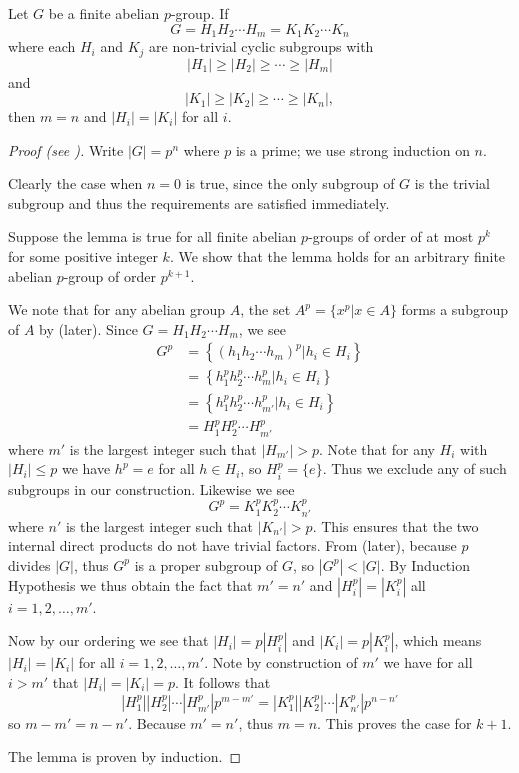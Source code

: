 \begin{lemma}\label{lemma-fundamental-theorem-of-finite-abelian-groups-4}
    Let $G$ be a finite abelian $p$-group. If
    \[
        G = H_1H_2\cdots H_m = K_1K_2\cdots K_n
    \]
    where each $H_i$ and $K_j$ are non-trivial cyclic subgroups with
    \[
        |H_1| \geq |H_2| \geq \cdots \geq |H_m|
    \]
    and
    \[
        |K_1| \geq |K_2| \geq \cdots \geq |K_n|,
    \]
    then $m = n$ and $|H_i| = |K_i|$ for all $i$.
\end{lemma}
\begin{proof}[Proof (see {\cite[p.~219, Lemma 4]{gallian_2016}})]
    Write $|G| = p^n$ where $p$ is a prime; we use strong induction on $n$.

    Clearly the case when $n = 0$ is true, since the only subgroup of $G$ is the trivial subgroup and thus the requirements are satisfied immediately.

    Suppose the lemma is true for all finite abelian $p$-groups of order of at most $p^k$ for some positive integer $k$. We show that the lemma holds for an arbitrary finite abelian $p$-group of order $p^{k+1}$.

    We note that for any abelian group $A$, the set $A^p = \{x^p \vert x \in A\}$ forms a subgroup of $A$ by  (later). Since $G = H_1H_2\cdots H_m$, we see
    \begin{align*}
        G^p &= \left\{\left(h_1h_2\cdots h_m\right)^p \vert h_i \in H_i\right\}\\
        &= \left\{h_1^ph_2^p\cdots h_m^p \vert h_i \in H_i\right\}\\
        &= \left\{h_1^ph_2^p\cdots h_{m'}^p \vert h_i \in H_i\right\}\\
        &= H_1^pH_2^p\cdots H_{m'}^p
    \end{align*}
    where $m'$ is the largest integer such that $|H_{m'}| > p$. Note that for any $H_i$ with $|H_i| \leq p$ we have $h^p = e$ for all $h \in H_i$, so $H_i^p = \{e\}$. Thus we exclude any of such subgroups in our construction. Likewise we see
    \[
        G^p = K_1^pK_2^p\cdots K_{n'}^p
    \]
    where $n'$ is the largest integer such that $|K_{n'}| > p$. This ensures that the two internal direct products do not have trivial factors. From  (later), because $p$ divides $|G|$, thus $G^p$ is a proper subgroup of $G$, so $|G^p| < |G|$. By Induction Hypothesis we thus obtain the fact that $m' = n'$ and $|H_i^p| = |K_i^p|$ all $i = 1, 2, \dots, m'$.

    Now by our ordering we see that $|H_i| = p|H_i^p|$ and $|K_i| = p|K_i^p|$, which means $|H_i| = |K_i|$ for all $i = 1, 2, \dots, m'$. Note by construction of $m'$ we have for all $i > m'$ that $|H_i| = |K_i| = p$. It follows that
    \[
        |H_1^p||H_2^p|\cdots|H_{m'}^p|p^{m-m'} = |K_1^p||K_2^p|\cdots|K_{n'}^p|p^{n-n'}
    \]
    so $m - m' = n - n'$. Because $m' = n'$, thus $m = n$. This proves the case for $k + 1$.

    The lemma is proven by induction.
\end{proof}

